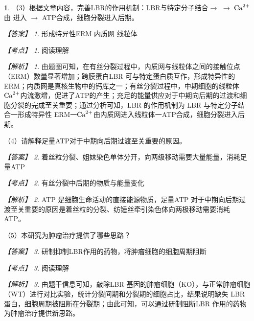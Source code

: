 \documentclass[UTF8, 10pt, a4paper, oneside]{ctexart}
\newcommand{\blank}{ \underbar{\quad$\blacktriangle$\quad} }%
\theoremstyle{definition}
\newtheorem{exercise}{}
\theoremstyle{remark}
\newtheorem*{answer}{【答案】}
\newtheorem*{point}{【考点】}      %
\newtheorem*{explanation}{【解析】}     %
\theoremstyle{plain}
\begin{document}
\begin{exercise}
（3）根据文章内容，完善LBR的作用机制：LBR与特定分子结合$\rightarrow$ \blank $\rightarrow$ $\ce{Ca^2+}$ 由 \blank 进入\blank $\rightarrow$ ATP合成，细胞分裂进入后期。

\begin{answer}
    形成特异性ERM \qquad 内质网 \qquad 线粒体
\end{answer}
\begin{point}
    阅读理解
\end{point}
\begin{explanation}
    由题图可知，在有丝分裂过程中，内质网与线粒体之间的接触位点（ERM）数量显著增加；跨膜蛋白LBR 可与特定蛋白质互作，形成特异性的 ERM；内质网是真核生物中的钙库之一；有丝分裂过程中，中期细胞的线粒体 $\ce{Ca^2+}$内流激增，促进了ATP的产生；充足的能量供应对于中期向后期的过渡和细胞分裂的完成至关重要；通过分析可知，LBR 的作用机制为 LBR 与特定分子结合一形成特异性 ERM一$\ce{Ca^2+}$由内质网进入线粒体一ATP合成，细胞分裂进入后期。
\end{explanation}

（4）请解释足量ATP对于中期向后期过渡至关重要的原因。

\begin{answer}
    着丝粒分裂、姐妹染色单体分开，向两级移动需要大量能量，消耗足量ATP
\end{answer}
\begin{point}
    有丝分裂中后期的物质与能量变化
\end{point}
\begin{explanation}
    ATP 是细胞生命活动的直接能源物质，足量ATP 对于中期向后期过渡至关重要的原因是着丝粒的分裂、纺锤丝牵引染色体向两极移动需要消耗 ATP。
\end{explanation}

（5）本研究为肿瘤治疗提供了哪些思路？

\begin{answer}
    研制抑制LBR作用的药物，将肿瘤细胞的细胞周期阻断
\end{answer}
\begin{point}
    阅读理解
\end{point}
\begin{explanation}
    由题干信息可知，敲除LBR 基因的肿瘤细胞（KO），与正常肿瘤细胞（WT）进行对比实验，统计分裂间期和分裂期的细胞占比，结果说明缺失 LBR 蛋白，细胞周期被阻断在分裂期；由此可知，可以通过研制阻断LBR 作用的药物为肿瘤治疗提供新思路。
\end{explanation}

\end{exercise}
\end{document}
